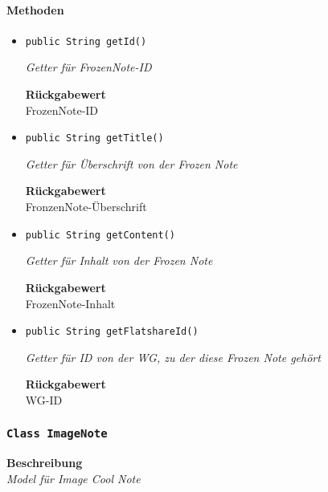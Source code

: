     \paragraph*{Methoden}
    \begin{itemize}
    	\item{\texttt{public String getId()}}
    	
    	\textit{Getter für FrozenNote-ID}
    	
    	
    	
    	\textbf{Rückgabewert} \\
    	FrozenNote-ID        \item{\texttt{public String getTitle()}}
    	
    	\textit{Getter für Überschrift von der Frozen Note}
    	
    	
    	
    	\textbf{Rückgabewert} \\
    	FronzenNote-Überschrift        \item{\texttt{public String getContent()}}
    	
    	\textit{Getter für Inhalt von der Frozen Note}
    	
    	
    	
    	\textbf{Rückgabewert} \\
    	FrozenNote-Inhalt        \item{\texttt{public String getFlatshareId()}}
    	
    	\textit{Getter für ID von der WG, zu der diese Frozen Note gehört}
    	
    	
    	
    	\textbf{Rückgabewert} \\
    	WG-ID
    \end{itemize}
    \subsubsection{\texttt{Class ImageNote}}
    \textbf{Beschreibung} \\
    \textit{Model für Image Cool Note}
